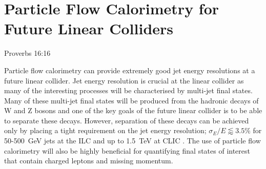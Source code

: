 \chapter{Particle Flow Calorimetry for Future Linear Colliders}
\label{chap:pflowandlcdetectors}

{Proverbs 16:16}


Particle flow calorimetry can provide extremely good jet energy resolutions at a future linear collider.  Jet energy resolution is crucial at the linear collider as many of the interesting processes will be characterised by multi-jet final states.  Many of these multi-jet final states will be produced from the hadronic decays of W and Z bosons and one of the key goals of the future linear collider is to be able to separate these decays.  However, separation of these decays can be achieved only by placing a tight requirement on the jet energy resolution; $\sigma_{E}/E \lessapprox 3.5\%$ for 50-500~GeV jets at the ILC and up to 1.5~TeV at CLIC \cite{arXiv:0907.3577}.  The use of particle flow calorimetry will also be highly beneficial for quantifying final states of interest that contain charged leptons and missing momentum.  


